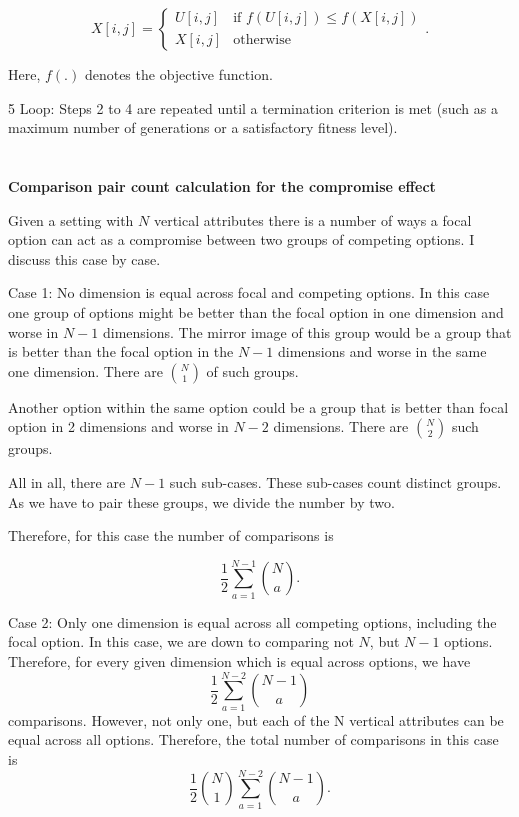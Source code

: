 \documentclass[a4paper,12pt]{article}
\begin{document}
        $$
        X[i, j] =
        \begin{cases}
            U[i, j] & \text{if } f(U[i, j]) \leq f(X[i, j]) \\
            X[i, j] & \text{otherwise}
        \end{cases} .
        $$

Here, $f(.)$ denotes the objective function.

5 Loop: Steps 2 to 4 are repeated until a termination criterion is met (such as a maximum number of generations or a satisfactory fitness level).



\clearpage
\section{}\label{appendix:compromiseCalculation}

\textbf{Comparison pair count calculation for the compromise effect}

Given a setting with $N$ vertical attributes there is a number of ways a focal option can act as a compromise between two groups of competing options.
I discuss this case by case.

Case 1: No dimension is equal across focal and competing options. In this case one group of options might be better than the focal option in one dimension and worse in $N-1$ dimensions. The mirror image of this group would be a group that is better than the focal option in the $N-1$ dimensions and worse in the same one dimension. There are $\binom{N}{1}$ of such groups.

Another option within the same option could be a group that is better than focal option in 2 dimensions and worse in $N-2$ dimensions. There are $\binom{N}{2}$ such groups. 

All in all, there are $N-1$ such sub-cases. These sub-cases count distinct groups. As we have to pair these groups, we divide the number by two.

Therefore, for this case the number of comparisons is 

$$\frac{1}{2}\sum_{a=1}^{N-1}\binom{N}{a}.$$

Case 2: Only one dimension is equal across all competing options, including the focal option. In this case, we are down to comparing not $N$, but $N-1$ options. Therefore, for every given dimension which is equal across options, we have $$\frac{1}{2}\sum_{a=1}^{N-2}\binom{N-1}{a}$$ comparisons. However, not only one, but each of the N vertical attributes can be equal across all options. Therefore, the total number of comparisons in this case is $$\frac{1}{2}\binom{N}{1}\sum_{a=1}^{N-2}{\binom{N-1}{a}.}$$
\end{document}
